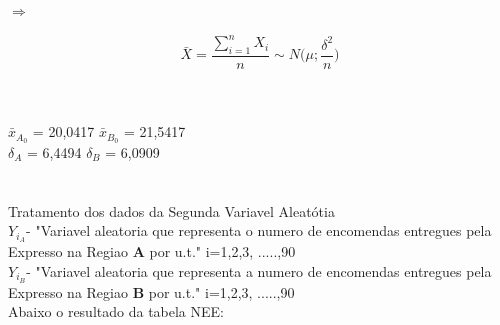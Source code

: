\hspace{3cm} $\Longrightarrow$ \hspace{3cm}
\begin{minipage}[l]{0pt}
\[\bar{X}=\frac{\sum_{i=1}^nX_i}{n}\sim N \big(\mu;\frac{\delta^2}{n}\big)\]
\end{minipage}\\
\\
$\bar{x}_{A_0}$ = 20,0417 \qquad $\bar{x}_{B_0}$ = 21,5417 \\
$\delta_A$ = 6,4494 \qquad $\delta_B$ = 6,0909\\
\\
\\
\noindent
Tratamento dos dados da Segunda Variavel Aleatótia \\
$Y_{i_A}$- "Variavel aleatoria que representa o numero de encomendas entregues pela Expresso na Regiao \textbf{A} por u.t." \quad i=1,2,3, .....,90 \\
$Y_{i_B}$- "Variavel aleatoria que representa a numero de encomendas entregues pela Expresso na Regiao \textbf{B} por u.t." \quad i=1,2,3, .....,90 \\
Abaixo o resultado da tabela NEE:\\
\\
